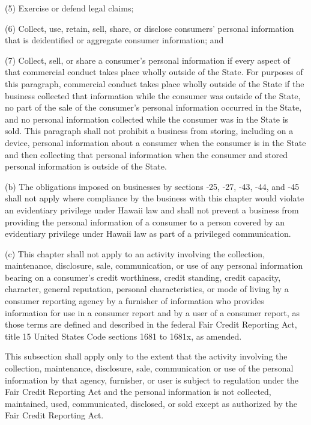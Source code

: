      (5)  Exercise or defend legal claims;

     (6)  Collect, use, retain, sell, share, or disclose consumers' personal information that is deidentified or aggregate consumer information; and

     (7)  Collect, sell, or share a consumer's personal information if every aspect of that commercial conduct takes place wholly outside of the State.  For purposes of this paragraph, commercial conduct takes place wholly outside of the State if the business collected that information while the consumer was outside of the State, no part of the sale of the consumer's personal information occurred in the State, and no personal information collected while the consumer was in the State is sold.  This paragraph shall not prohibit a business from storing, including on a device, personal information about a consumer when the consumer is in the State and then collecting that personal information when the consumer and stored personal information is outside of the State.

     (b)  The obligations imposed on businesses by sections    ‑25,    -27,    ‑43,    -44, and    -45 shall not apply where compliance by the business with this chapter would violate an evidentiary privilege under Hawaii law and shall not prevent a business from providing the personal information of a consumer to a person covered by an evidentiary privilege under Hawaii law as part of a privileged communication.

     (c)  This chapter shall not apply to an activity involving the collection, maintenance, disclosure, sale, communication, or use of any personal information bearing on a consumer's credit worthiness, credit standing, credit capacity, character, general reputation, personal characteristics, or mode of living by a consumer reporting agency by a furnisher of information who provides information for use in a consumer report and by a user of a consumer report, as those terms are defined and described in the federal Fair Credit Reporting Act, title 15 United States Code sections 1681 to 1681x, as amended.

     This subsection shall apply only to the extent that the activity involving the collection, maintenance, disclosure, sale, communication or use of the personal information by that agency, furnisher, or user is subject to regulation under the Fair Credit Reporting Act and the personal information is not collected, maintained, used, communicated, disclosed, or sold except as authorized by the Fair Credit Reporting Act.

